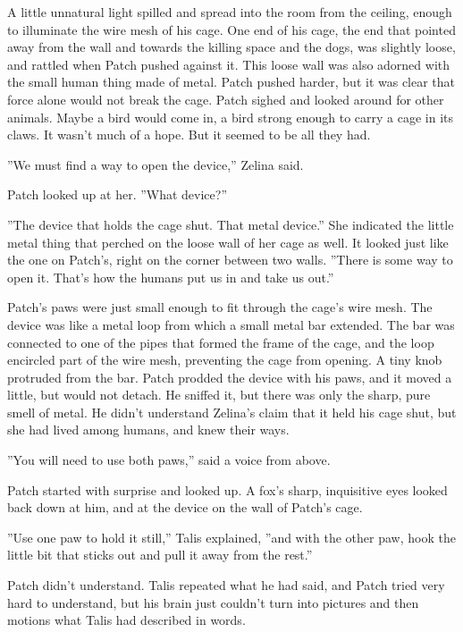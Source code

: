 \documentclass[11pt]{article}
\begin{document}
 A little unnatural light spilled and spread into the room from the ceiling, enough to illuminate the wire mesh of his cage. One end of his cage, the end that pointed away from the wall and towards the killing space and the dogs, was slightly loose, and rattled when Patch pushed against it. This loose wall was also adorned with the small human thing made of metal. Patch pushed harder, but it was clear that force alone would not break the cage. Patch sighed and looked around for other animals. Maybe a bird would come in, a bird strong enough to carry a cage in its claws. It wasn't much of a hope. But it seemed to be all they had.\par
 ''We must find a way to open the device,'' Zelina said.\par
 Patch looked up at her. ''What device?''\par
 ''The device that holds the cage shut. That metal device.'' She indicated the little metal thing that perched on the loose wall of her cage as well. It looked just like the one on Patch's, right on the corner between two walls. ''There is some way to open it. That's how the humans put us in and take us out.''\par
 Patch's paws were just small enough to fit through the cage's wire mesh. The device was like a metal loop from which a small metal bar extended. The bar was connected to one of the pipes that formed the frame of the cage, and the loop encircled part of the wire mesh, preventing the cage from opening. A tiny knob protruded from the bar. Patch prodded the device with his paws, and it moved a little, but would not detach. He sniffed it, but there was only the sharp, pure smell of metal. He didn't understand Zelina's claim that it held his cage shut, but she had lived among humans, and knew their ways.\par
 ''You will need to use both paws,'' said a voice from above.\par
 Patch started with surprise and looked up. A fox's sharp, inquisitive eyes looked back down at him, and at the device on the wall of Patch's cage.\par
 ''Use one paw to hold it still,'' Talis explained, ''and with the other paw, hook the little bit that sticks out and pull it away from the rest.''\par
 Patch didn't understand. Talis repeated what he had said, and Patch tried very hard to understand, but his brain just couldn't turn into pictures and then motions what Talis had described in words.\par
\end{document}
